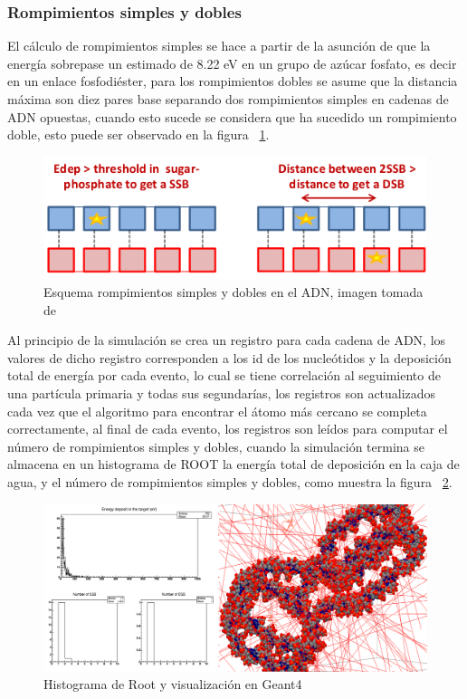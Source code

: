 \subsubsection{Rompimientos simples y dobles}
El cálculo de rompimientos simples se hace a partir  de la asunción de que la energía sobrepase un estimado de 8.22 eV en un grupo de azúcar fosfato, es decir en un enlace fosfodiéster, para los rompimientos dobles se asume que la distancia máxima son diez pares base separando dos rompimientos simples en cadenas de ADN opuestas, cuando esto sucede se considera que ha sucedido un rompimiento doble\cite{pdblib}, esto puede ser observado en la figura ~\ref{fig:sbdb}.

\begin{figure}[htbp]
    \centering
    \includegraphics[width=.8\linewidth]{./Figures/romp.png}
    \caption[Esquema rompimientos simples y dobles en el ADN]{Esquema rompimientos simples y dobles en el ADN, imagen tomada de \cite{handson} }
    \label{fig:sbdb}
\end{figure}

Al principio de la simulación se crea un registro para cada cadena de ADN, los valores de dicho registro corresponden a los id de los nucleótidos y la deposición total de energía por cada evento, lo cual se tiene correlación al seguimiento de una partícula primaria y todas sus  segundarías, los registros son actualizados cada vez que el algoritmo para encontrar el átomo más cercano se completa correctamente, al final de cada evento, los registros son leídos para computar el número de rompimientos simples y dobles, cuando la simulación termina se almacena  en un histograma de ROOT la energía total de deposición en la caja de agua, y el número de rompimientos simples y dobles\cite{pdblib}, como muestra la figura ~\ref{fig:histosbdb}.

\begin{figure}[htbp]
    \centering
    \includegraphics[width=1\linewidth]{./Figures/c1.png}
    \caption[Histograma de Root]{Histograma de Root y visualización en Geant4}
    \label{fig:histosbdb}
\end{figure}

